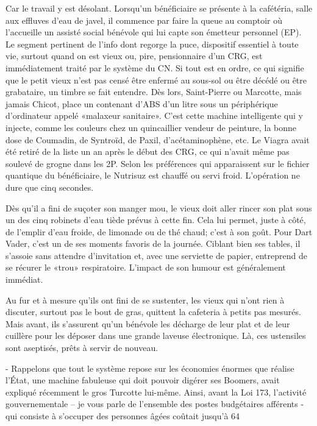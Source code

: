Car le travail y est désolant. Lorsqu’un bénéficiaire se présente à la cafétéria, salle aux effluves d’eau de javel, il commence par faire la queue au comptoir où l’accueille un assisté social bénévole qui lui capte son émetteur personnel (EP). Le segment pertinent de l’info dont regorge la puce, dispositif essentiel à toute vie, surtout quand on est vieux ou, pire, pensionnaire d’un CRG, est immédiatement traité par le système du CN. Si tout est en ordre, ce qui signifie que le petit vieux n’est pas censé être enfermé au sous-sol ou être décédé ou être grabataire, un timbre se fait entendre. Dès lors, Saint-Pierre ou Marcotte, mais jamais Chicot, place un contenant d’ABS d’un litre sous un périphérique d’ordinateur appelé «malaxeur sanitaire». C’est cette machine intelligente qui y injecte, comme les couleurs chez un quincaillier vendeur de peinture, la bonne dose de Coumadin, de Syntroïd, de Paxil, d’acétaminophène, etc. Le Viagra avait été retiré de la liste un an après le début des CRG, ce qui n’avait même pas soulevé de grogne dans les 2P. Selon les préférences qui apparaissent sur le fichier quantique du bénéficiaire, le Nutrisuz est chauffé ou servi froid. L’opération ne dure que cinq secondes.

Dès qu’il a fini de suçoter son manger mou, le vieux doit aller rincer son plat sous un des cinq robinets d’eau tiède prévus à cette fin. Cela lui permet, juste à côté, de l’emplir d’eau froide, de limonade ou de thé chaud; c’est à son goût. Pour Dart Vader, c’est un de ses moments favoris de la journée. Ciblant bien ses tables, il s’assoie sans attendre d’invitation et, avec une serviette de papier, entreprend de se récurer le «trou» respiratoire. L’impact de son humour est généralement immédiat.

Au fur et à mesure qu’ils ont fini de se sustenter, les vieux qui n’ont rien à discuter, surtout pas le bout de gras, quittent la cafeteria à petits pas mesurés. Mais avant, ils s’assurent qu’un bénévole les décharge de leur plat et de leur cuillère pour les déposer dans une grande laveuse électronique. Là, ces ustensiles sont aseptisés, prêts à servir de nouveau.

- Rappelons que tout le système repose sur les économies énormes que réalise l’État, une machine fabuleuse qui doit pouvoir digérer ses Boomers, avait expliqué récemment le gros Turcotte lui-même. Ainsi, avant la Loi 173, l’activité gouvernementale – je vous parle de l’ensemble des postes budgétaires afférents - qui consiste à s’occuper des personnes âgées coûtait jusqu’à 64 %

